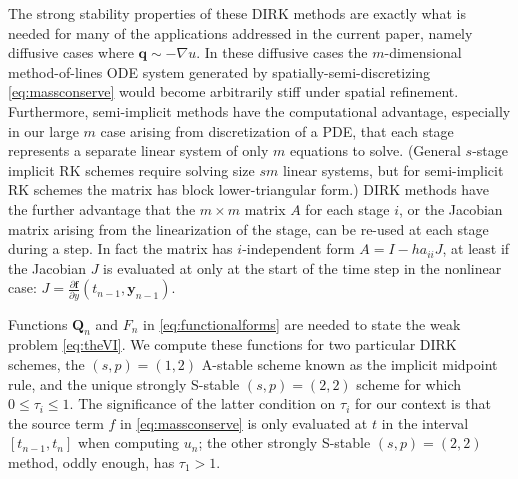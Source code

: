\documentclass[final,leqno,onefignum,onetabnum]{siamltex1213bueler}
\newcommand\bbf{\mathbf{f}}
\newcommand\bq{\mathbf{q}}
\newcommand\by{\mathbf{y}}
\newcommand\bQ{\mathbf{Q}}
\renewcommand{\grad}{\nabla}
\begin{document}
The strong stability properties of these DIRK methods are exactly what is needed for many of the applications addressed in the current paper, namely diffusive cases where $\bq \sim - \grad u$.  In these diffusive cases the $m$-dimensional method-of-lines ODE system generated by spatially-semi-discretizing \eqref{eq:massconserve} would become arbitrarily stiff under spatial refinement.  Furthermore, semi-implicit methods have the computational advantage, especially in our large $m$ case arising from discretization of a PDE, that each stage represents a separate linear system of only $m$ equations to solve.  (General $s$-stage implicit RK schemes require solving size $sm$ linear systems, but for semi-implicit RK schemes the matrix has block lower-triangular form.)  DIRK methods have the further advantage that the $m\times m$ matrix $A$ for each stage $i$, or the Jacobian matrix arising from the linearization of the stage, can be re-used at each stage during a step. In fact the matrix has $i$-independent form $A = I - h a_{ii} J$, at least if the Jacobian $J$ is evaluated at only at the start of the time step in the nonlinear case: $J = \frac{\partial \bbf}{\partial y}(t_{n-1},\by_{n-1})$.

Functions $\bQ_n$ and $F_n$ in \eqref{eq:functionalforms} are needed to state the weak problem \eqref{eq:theVI}.  We compute these functions for two particular DIRK schemes, the $(s,p)=(1,2)$ A-stable scheme known as the implicit midpoint rule, and the unique strongly S-stable $(s,p)=(2,2)$ scheme for which $0\le \tau_i\le 1$.  The significance of the latter condition on $\tau_i$ for our context is that the source term $f$ in \eqref{eq:massconserve} is only evaluated at $t$ in the interval $[t_{n-1},t_n]$ when computing $u_n$; the other strongly S-stable $(s,p)=(2,2)$ method, oddly enough, has $\tau_1>1$.
\end{document}
